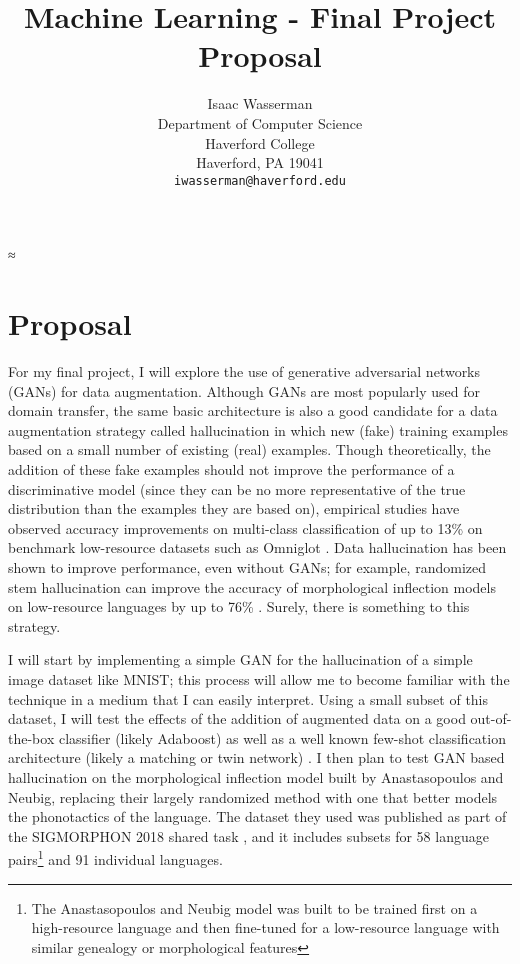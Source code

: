 ≈\documentclass{article}
\title{Machine Learning - Final Project Proposal}
\author{%
  Isaac Wasserman\\
  Department of Computer Science\\
  Haverford College\\
  Haverford, PA 19041\\
  \texttt{iwasserman@haverford.edu} \\
}
\begin{document}
  \maketitle

  \section{Proposal}
  For my final project, I will explore the use of generative adversarial networks (GANs) for data augmentation. Although GANs are most popularly used for domain transfer, the same basic architecture is also a good candidate for a data augmentation strategy called hallucination in which new (fake) training examples based on a small number of existing (real) examples. Though theoretically, the addition of these fake examples should not improve the performance of a discriminative model (since they can be no more representative of the true distribution than the examples they are based on), empirical studies have observed accuracy improvements on multi-class classification of up to 13\% on benchmark low-resource datasets such as Omniglot \cite{antoniou}. Data hallucination has been shown to improve performance, even without GANs; for example, randomized stem hallucination can improve the accuracy of morphological inflection models on low-resource languages by up to 76\% \cite{anastasopoulos-neubig-2019-pushing}. Surely, there is something to this strategy.

  I will start by implementing a simple GAN for the hallucination of a simple image dataset like MNIST; this process will allow me to become familiar with the technique in a medium that I can easily interpret. Using a small subset of this dataset, I will test the effects of the addition of augmented data on a good out-of-the-box classifier (likely Adaboost) as well as a well known few-shot classification \cite{fewshot} architecture (likely a matching or twin network) \cite{matching-networks} \cite{twin-networks}. I then plan to test GAN based hallucination on the morphological inflection model built by Anastasopoulos and Neubig, replacing their largely randomized method with one that better models the phonotactics of the language. The dataset they used was published as part of the SIGMORPHON 2018 shared task \cite{sigmorphon}, and it includes subsets for 58 language pairs\footnote{The Anastasopoulos and Neubig model was built to be trained first on a high-resource language and then fine-tuned for a low-resource language with similar genealogy or morphological features} and 91 individual languages.
\end{document}
